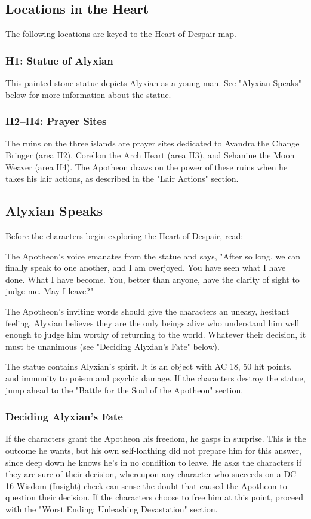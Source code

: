 \documentclass[10pt,a4paper,twoside,fancy,bg=print,twocolumn,openany,nodeprecatedcode]{dndbook}
\begin{document}
\subsection{Locations in the Heart}
The following locations are keyed to the Heart of Despair map.

\subsubsection{H1: Statue of Alyxian}
This painted stone statue depicts Alyxian as a young man. See "Alyxian Speaks" below for more information about the statue.

\subsubsection{H2–H4: Prayer Sites}
The ruins on the three islands are prayer sites dedicated to Avandra the Change Bringer (area H2), Corellon the Arch Heart (area H3), and Sehanine the Moon Weaver (area H4). The Apotheon draws on the power of these ruins when he takes his lair actions, as described in the "Lair Actions" section.

\subsection{Alyxian Speaks}
Before the characters begin exploring the Heart of Despair, read:

\begin{DndReadAloud}{}
The Apotheon's voice emanates from the statue and says, "After so long, we can finally speak to one another, and I am overjoyed. You have seen what I have done. What I have become. You, better than anyone, have the clarity of sight to judge me. May I leave?"

\end{DndReadAloud}

The Apotheon's inviting words should give the characters an uneasy, hesitant feeling. Alyxian believes they are the only beings alive who understand him well enough to judge him worthy of returning to the world. Whatever their decision, it must be unanimous (see "Deciding Alyxian's Fate" below).

The statue contains Alyxian's spirit. It is an object with AC 18, 50 hit points, and immunity to poison and psychic damage. If the characters destroy the statue, jump ahead to the "Battle for the Soul of the Apotheon" section.

\subsubsection{Deciding Alyxian's Fate}
If the characters grant the Apotheon his freedom, he gasps in surprise. This is the outcome he wants, but his own self-loathing did not prepare him for this answer, since deep down he knows he's in no condition to leave. He asks the characters if they are sure of their decision, whereupon any character who succeeds on a DC 16 Wisdom (Insight) check can sense the doubt that caused the Apotheon to question their decision. If the characters choose to free him at this point, proceed with the "Worst Ending: Unleashing Devastation" section.
\end{document}
